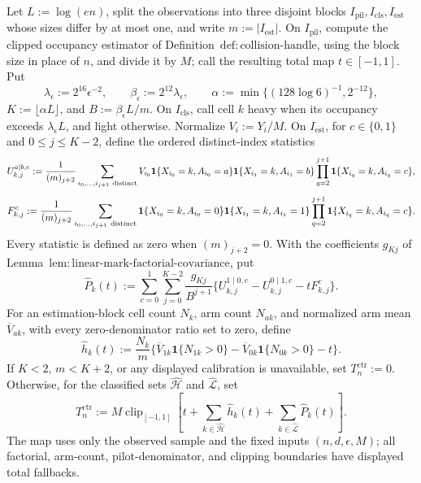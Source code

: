 Let \(L:=\log(en)\), split the observations into three disjoint blocks \(I_{\mathrm{pil}},I_{\mathrm{cls}},I_{\mathrm{est}}\) whose sizes differ by at most one, and write \(m:=|I_{\mathrm{est}}|\).  On \(I_{\mathrm{pil}}\), compute the clipped occupancy estimator of Definition~\(\mathrm{def:collision\text{-}handle}\), using the block size in place of \(n\), and divide it by \(M\); call the resulting total map \(t\in[-1,1]\).  Put
\[
 \lambda_{\epsilon}:=2^{16}\epsilon^{-2},\qquad
 \beta_{\epsilon}:=2^{12}\lambda_{\epsilon},\qquad
 \alpha:=\min\{(128\log 6)^{-1},2^{-12}\},
\]
\(K:=\lfloor\alpha L\rfloor\), and \(B:=\beta_{\epsilon}L/m\).  On \(I_{\mathrm{cls}}\), call cell \(k\) heavy when its occupancy exceeds \(\lambda_{\epsilon}L\), and light otherwise.  Normalize \(V_i:=Y_i/M\).  On \(I_{\mathrm{est}}\), for \(c\in\{0,1\}\) and \(0\le j\le K-2\), define the ordered distinct-index statistics
\[
 U_{k,j}^{a\mid b,c}:=\frac{1}{(m)_{j+2}}
 \sum_{i_0,\ldots,i_{j+1}\ {\rm distinct}}
 V_{i_0}\mathbf 1\{X_{i_0}=k,A_{i_0}=a\}
 \mathbf 1\{X_{i_1}=k,A_{i_1}=b\}
 \prod_{q=2}^{j+1}\mathbf 1\{X_{i_q}=k,A_{i_q}=c\},
\]
\[
 F_{k,j}^{c}:=\frac{1}{(m)_{j+2}}
 \sum_{i_0,\ldots,i_{j+1}\ {\rm distinct}}
 \mathbf 1\{X_{i_0}=k,A_{i_0}=0\}
 \mathbf 1\{X_{i_1}=k,A_{i_1}=1\}
 \prod_{q=2}^{j+1}\mathbf 1\{X_{i_q}=k,A_{i_q}=c\}.
\]
Every statistic is defined as zero when \((m)_{j+2}=0\).  With the coefficients \(g_{Kj}\) of Lemma~\(\mathrm{lem:linear\text{-}mark\text{-}factorial\text{-}covariance}\), put
\[
 \widehat P_k(t):=
 \sum_{c=0}^1\sum_{j=0}^{K-2}\frac{g_{Kj}}{B^{j+1}}
 \{U_{k,j}^{1\mid0,c}-U_{k,j}^{0\mid1,c}-tF_{k,j}^{c}\}.
\]
For an estimation-block cell count \(N_k\), arm count \(N_{ak}\), and normalized arm mean \(\overline V_{ak}\), with every zero-denominator ratio set to zero, define
\[
 \widehat h_k(t):=\frac{N_k}{m}
 \{\overline V_{1k}\mathbf 1\{N_{1k}>0\}
 -\overline V_{0k}\mathbf 1\{N_{0k}>0\}-t\}.
\]
If \(K<2\), \(m<K+2\), or any displayed calibration is unavailable, set \(T_n^{\mathrm{ctr}}:=0\).  Otherwise, for the classified sets \(\widehat{\mathcal H}\) and \(\widehat{\mathcal L}\), set
\[
 T_n^{\mathrm{ctr}}:=M\operatorname{clip}_{[-1,1]}\!\left[
 t+\sum_{k\in\widehat{\mathcal H}}\widehat h_k(t)
 +\sum_{k\in\widehat{\mathcal L}}\widehat P_k(t)
 \right].
\]
The map uses only the observed sample and the fixed inputs \((n,d,\epsilon,M)\); all factorial, arm-count, pilot-denominator, and clipping boundaries have displayed total fallbacks.
